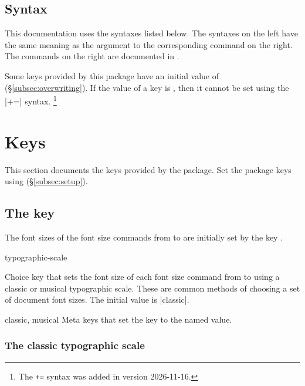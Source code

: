 \documentclass{beerydoc}
\begin{document}
\subsection{Syntax}
\label{subsec:syntax}

This documentation uses the syntaxes listed below.
The syntaxes on the left have the same meaning as the argument to the
corresponding command on the right.
The commands on the right are documented in .


Some keys provided by this package have an initial value of 
(\S\ref{subsec:overwriting}).
If the value of a key is , then it cannot be set using the |+=|
syntax.%
\footnote
  {The \texttt{+=} syntax was added in  version 2026-11-16.}


\section{Keys}
\label{sec:keys}

This section documents the keys provided by the  package.
Set the package keys using  (\S\ref{subsec:setup}).

\subsection{The key }
\label{subsec:scale}

The font sizes of the font size commands from  to  are
initially set by the key .

\begin{codedoc}{typographic-scale}
  \begin{syntax}
  \end{syntax}
  Choice key that sets the font size of each font size command from 
  to  using a classic or musical typographic scale.
  These are common methods of choosing a set of document font sizes.
  The initial value is |classic|.
\end{codedoc}

\begin{codedoc}{classic, musical}
  Meta keys that set the key  to the named value.
\end{codedoc}

\subsubsection{The classic typographic scale}
\label{subsubsec:classic}
\end{document}
